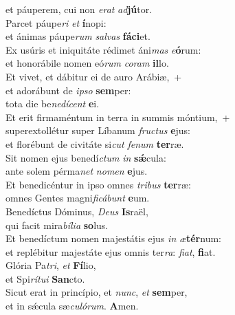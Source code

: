 \evenverse et páuperem, cui non \textit{e}\textit{rat} \textit{ad}\textbf{jú}tor.\\
\oddverse Parcet páupe\textit{ri} \textit{et} \textbf{í}nopi:~\*\\
\oddverse et ánimas páupe\textit{rum} \textit{sal}\textit{vas} \textbf{fá}\textbf{ci}et.\\
\evenverse Ex usúris et iniquitáte rédimet áni\textit{mas} \textit{e}\textbf{ó}rum:~\*\\
\evenverse et honorábile nomen eó\textit{rum} \textit{co}\textit{ram} \textbf{il}lo.\\
\oddverse Et vivet, et dábitur ei de auro Arábiæ,~+\\
\oddverse  et adorábunt de \textit{i}\textit{pso} \textbf{sem}per:~\*\\
\oddverse tota die be\textit{ne}\textit{dí}\textit{cent} \textbf{e}i.\\
\evenverse Et erit firmaméntum in terra in summis móntium,~+\\
\evenverse  superextollétur super Líbanum \textit{fru}\textit{ctus} \textbf{e}jus:~\*\\
\evenverse et florébunt de civitáte si\textit{cut} \textit{fe}\textit{num} \textbf{ter}ræ.\\
\oddverse Sit nomen ejus benedí\textit{ctum} \textit{in} \textbf{sǽ}cula:~\*\\
\oddverse ante solem pérma\textit{net} \textit{no}\textit{men} \textbf{e}jus.\\
\evenverse Et benedicéntur in ipso omnes \textit{tri}\textit{bus} \textbf{ter}ræ:~\*\\
\evenverse omnes Gentes magni\textit{fi}\textit{cá}\textit{bunt} \textbf{e}um.\\
\oddverse Benedíctus Dóminus, \textit{De}\textit{us} \textbf{Is}raël,~\*\\
\oddverse qui facit mira\textit{bí}\textit{li}\textit{a} \textbf{so}lus.\\
\evenverse Et benedíctum nomen majestátis ejus \textit{in} \textit{æ}\textbf{tér}num:~\*\\
\evenverse et replébitur majestáte ejus omnis ter\textit{ra}: \textit{fi}\textit{at}, \textbf{fi}at.\\
\oddverse Glória Pa\textit{tri}, \textit{et} \textbf{Fí}lio,~\*\\
\oddverse et Spi\textit{rí}\textit{tu}\textit{i} \textbf{San}cto.\\
\evenverse Sicut erat in princípio, et \textit{nunc}, \textit{et} \textbf{sem}per,~\*\\
\evenverse et in sǽcula sæ\textit{cu}\textit{ló}\textit{rum}. \textbf{A}men.\\
